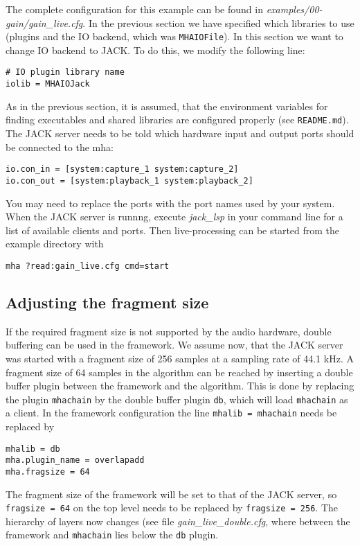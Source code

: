 The complete configuration for this example can be found in
\emph{examples/00-gain/gain\_live.cfg}.
In the previous section we have specified which libraries to use
(plugins and the IO backend, which was \verb!MHAIOFile!). In this section 
we want to change IO backend to JACK. 
%
To do this, we modify the following line:
\begin{verbatim}
# IO plugin library name
iolib = MHAIOJack
\end{verbatim}
%
As in the previous section, it is assumed, that the environment
variables for finding executables and shared libraries are configured
properly (see \verb!README.md!).
The JACK server needs to be told which hardware input and output ports should be
connected to the mha:
\begin{verbatim}
io.con_in = [system:capture_1 system:capture_2]
io.con_out = [system:playback_1 system:playback_2]
\end{verbatim}
You may need to replace the ports with the port names used
by your system.
When the JACK server is runnng, execute \emph{jack\_lsp} in your command
line for a list of available clients and ports.
%
Then \mha{} live-processing can be started from the example directory with
\begin{verbatim}
mha ?read:gain_live.cfg cmd=start
\end{verbatim}

\subsection{Adjusting the fragment size}%
%
%

If the required fragment size is not supported by the audio hardware,
double buffering can be used in the \mha{} framework. We assume now,
that the JACK server was started with a fragment size of 256 samples at
a sampling rate of 44.1 kHz. A fragment size of 64 samples in the algorithm 
can be reached by inserting a double buffer plugin between the framework and the algorithm. This is
done by replacing the \mha{} plugin \verb!mhachain! by the double
buffer plugin \verb!db!, which will load \verb!mhachain! as a
client. In the framework configuration the line \verb!mhalib = mhachain! needs
be replaced by
\begin{verbatim}
mhalib = db
mha.plugin_name = overlapadd
mha.fragsize = 64
\end{verbatim}
The fragment size of the framework will be set to that of the JACK
server, so \verb!fragsize = 64! on the top level needs to be replaced by
\verb!fragsize = 256!. The hierarchy of layers now changes (see 
file \emph{gain\_live\_double.cfg}, where between the framework
and \verb!mhachain! lies below the \verb!db! plugin.


